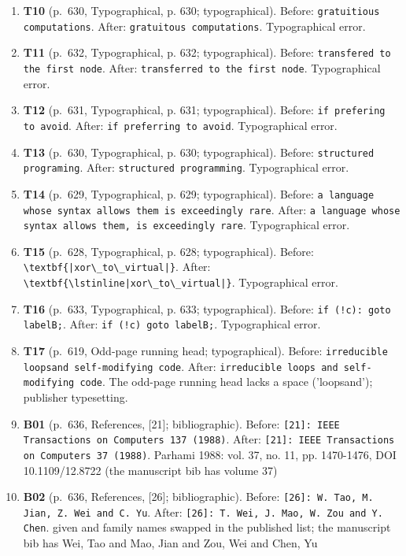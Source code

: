 \documentclass[9pt,twocolumn]{article}
\begin{document}
\begin{enumerate}[label=]
\item \textbf{T10} (p.~630, Typographical, p. 630; typographical). Before: \texttt{gratuitious computations}. After: \texttt{gratuitous computations}. Typographical error. 
\item \textbf{T11} (p.~632, Typographical, p. 632; typographical). Before: \texttt{transfered to the first node}. After: \texttt{transferred to the first node}. Typographical error. 
\item \textbf{T12} (p.~631, Typographical, p. 631; typographical). Before: \texttt{if prefering to avoid}. After: \texttt{if preferring to avoid}. Typographical error. 
\item \textbf{T13} (p.~630, Typographical, p. 630; typographical). Before: \texttt{structured programing}. After: \texttt{structured programming}. Typographical error. 
\item \textbf{T14} (p.~629, Typographical, p. 629; typographical). Before: \texttt{a language whose syntax allows them is exceedingly rare}. After: \texttt{a language whose syntax allows them, is exceedingly rare}. Typographical error. 
\item \textbf{T15} (p.~628, Typographical, p. 628; typographical). Before: \texttt{\textbackslash{}textbf\{|xor\textbackslash{}\_to\textbackslash{}\_virtual|\}}. After: \texttt{\textbackslash{}textbf\{\textbackslash{}lstinline|xor\textbackslash{}\_to\textbackslash{}\_virtual|\}}. Typographical error. 
\item \textbf{T16} (p.~633, Typographical, p. 633; typographical). Before: \texttt{if (!c): goto labelB;}. After: \texttt{if (!c) goto labelB;}. Typographical error. 
\item \textbf{T17} (p.~619, Odd-page running head; typographical). Before: \texttt{irreducible loopsand self-modifying code}. After: \texttt{irreducible loops and self-modifying code}. The odd-page running head lacks a space ('loopsand'); publisher typesetting. 
\item \textbf{B01} (p.~636, References, [21]; bibliographic). Before: \texttt{[21]: IEEE Transactions on Computers 137 (1988)}. After: \texttt{[21]: IEEE Transactions on Computers 37 (1988)}. Parhami 1988: vol. 37, no. 11, pp. 1470-1476, DOI 10.1109/12.8722 (the manuscript bib has volume 37) 
\item \textbf{B02} (p.~636, References, [26]; bibliographic). Before: \texttt{[26]: W. Tao, M. Jian, Z. Wei and C. Yu}. After: \texttt{[26]: T. Wei, J. Mao, W. Zou and Y. Chen}. given and family names swapped in the published list; the manuscript bib has Wei, Tao and Mao, Jian and Zou, Wei and Chen, Yu 

\end{enumerate}
\end{document}
